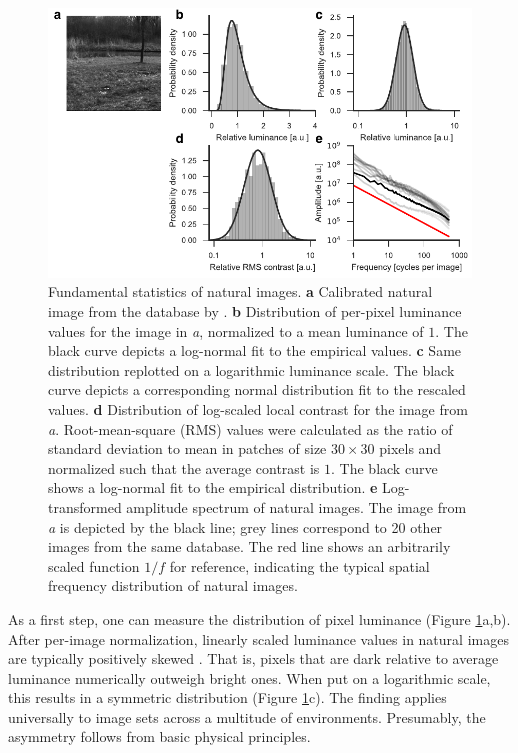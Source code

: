 \begin{figure}
    \centering
    \includegraphics[width=1\textwidth]{graphics/figure_natstats}
    \caption[Fundamental statistics of natural images]
    {Fundamental statistics of natural images. \textbf{a} Calibrated natural image from the database by \citet{vanHateren:1998jt}. \textbf{b} Distribution of per-pixel luminance values for the image in \textit{a}, normalized to a mean luminance of $1$. The black curve depicts a log-normal fit to the empirical values. \textbf{c} Same distribution replotted on a logarithmic luminance scale. The black curve depicts a corresponding normal distribution fit to the rescaled values. \textbf{d} Distribution of log-scaled local contrast for the image from \textit{a}. Root-mean-square (RMS) values were calculated as the ratio of standard deviation to mean in patches of size $30 \times 30$ pixels and normalized such that the average contrast is $1$. The black curve shows a log-normal fit to the empirical distribution. \textbf{e} Log-transformed amplitude spectrum of natural images. The image from \textit{a} is depicted by the black line; grey lines correspond to 20 other images from the same database. The red line shows an arbitrarily scaled function $1/f$ for reference, indicating the typical spatial frequency distribution of natural images.}
    \label{fig:natstats}
\end{figure}

As a first step, one can measure the distribution of pixel luminance (Figure \ref{fig:natstats}a,b). After per-image normalization, linearly scaled luminance values in natural images are typically positively skewed \citep{Laughlin:1981wn,Brady:2000aa,Geisler:2008gu}. That is, pixels that are dark relative to average luminance numerically outweigh bright ones. When put on a logarithmic scale, this results in a symmetric distribution (Figure \ref{fig:natstats}c). The finding applies universally to image sets across a multitude of environments. Presumably, the asymmetry follows from basic physical principles.

